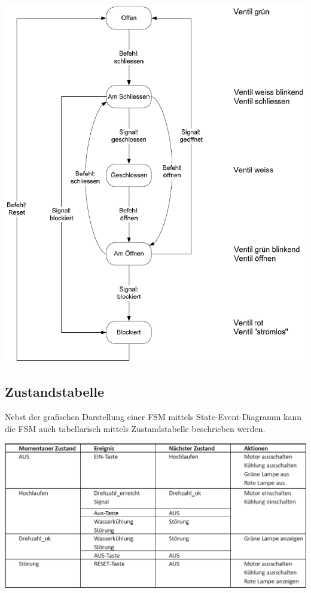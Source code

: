 \begin{center}
    \includegraphics[width=0.8\columnwidth]{images/state_event_example.png}
\end{center}


\subsection{Zustandstabelle}

Nebst der grafischen Darstellung einer FSM mittels State-Event-Diagramm kann die FSM auch tabellarisch mittels Zustandstabelle 
beschrieben werden.



\includegraphics[width=\columnwidth]{images/zustandstabelle.png}

